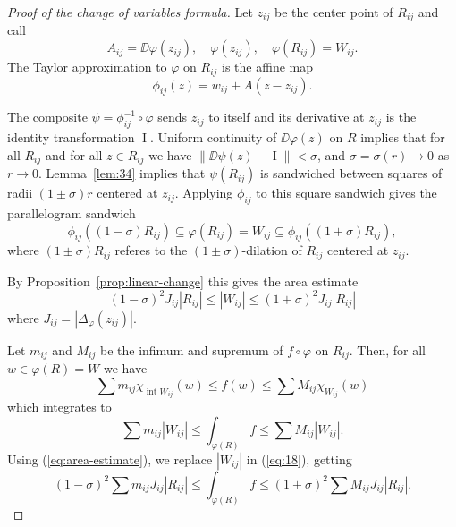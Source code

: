 \documentclass[11pt]{article}
\begin{document}
\begin{proof}[Proof of the change of variables formula]
  Let $z_{ij}$ be the center point of $R_{ij}$ and call
  \[
    A_{ij} = \DD \varphi(z_{ij}), \quad \varphi(z_{ij}), \quad \varphi(R_{ij}) = W_{ij}.
  \]
  The Taylor approximation to $\varphi$ on $R_{ij}$ is the affine map
  \[
    \phi_{ij}(z) = w_{ij} + A (z - z_{ij}).
  \]

  The composite $\psi = \phi_{ij}^{-1} \circ \varphi$ sends $z_{ij}$ to itself and its derivative at $z_{ij}$ is the identity transformation $\operatorname{I}$.  Uniform continuity of $\DD\varphi(z)$ on $R$ implies that for all $R_{ij}$ and for all $z \in R_{ij}$ we have $\| \DD \psi(z) - \operatorname{I} \| < \sigma$, and $\sigma = \sigma(r) \to 0$ as $r \to 0$.  Lemma~\ref{lem:34} implies that $\psi(R_{ij})$ is sandwiched between squares of radii $(1\pm\sigma) r$ centered at $z_{ij}$.  Applying $\phi_{ij}$ to this square sandwich gives the parallelogram sandwich
  \begin{equation}
    \label{eq:sandwich}
    \phi_{ij}( (1-\sigma) R_{ij} ) \subseteq \varphi(R_{ij}) = W_{ij} \subseteq \phi_{ij}( (1+\sigma) R_{ij}),
  \end{equation}
  where $(1\pm\sigma)R_{ij}$ referes to the $(1\pm\sigma)$-dilation of $R_{ij}$ centered at $z_{ij}$.

  By Proposition~\ref{prop:linear-change} this gives the area estimate
  \begin{equation}
    \label{eq:area-estimate}
    (1-\sigma)^2 J_{ij} |R_{ij}| \leqslant |W_{ij}| \leqslant (1+\sigma)^2 J_{ij} |R_{ij}|
  \end{equation}
  where $J_{ij} = | \Delta_\varphi(z_{ij}) |$.

  Let $m_{ij}$ and $M_{ij}$ be the infimum and supremum of $f \circ \varphi$ on $R_{ij}$.  Then, for all $w \in \varphi(R) = W$ we have
  \[
    \sum m_{ij} \chi_{\operatorname{int} W_{ij}}(w) \leqslant f(w) \leqslant \sum M_{ij} \chi_{W_{ij}}(w)
  \]
  which integrates to
  \begin{equation}
    \label{eq:18}
    \sum m_{ij} |W_{ij}| \leqslant \int_{\varphi(R)} f \leqslant \sum M_{ij} |W_{ij}|.
  \end{equation}
  Using (\ref{eq:area-estimate}), we replace $|W_{ij}|$ in (\ref{eq:18}), getting
  \[
    (1-\sigma)^2 \sum m_{ij} J_{ij} |R_{ij}| \leqslant \int_{\varphi(R)} f \leqslant (1 + \sigma)^2 \sum M_{ij} J_{ij} |R_{ij}|.
  \]


\end{proof}
\end{document}
